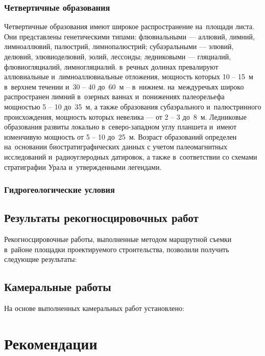 \subsubsection*{Четвертичные образования}
Четвертичные образования имеют широкое распространение на~площади листа. Они представлены генетическими типами: флювиальными --- аллювий, лимний, лимноаллювий, палюстрий, лимнопалюстрий; субаэральными --- элювий, делювий, элювиоделювий, эолий, лессоиды; ледниковыми --- гляциалий, флювиогляциалий, лимногляциалий. в~речных долинах превалируют аллювиальные и~лимноаллювиальные отложения, мощность которых 10 -- 15~м в~верхнем течении и~30 -- 40 до~60~м -- в~нижнем. на~междуречьях широко распространен лимний в~озерных ваннах и~понижениях палеорельефа мощностью 5 -- 10 до~35~м, а также образования субаэрального и~палюстринного происхождения, мощность которых невелика --- 
от 2 -- 3 до~8~м. Ледниковые образования развиты локально в~северо-западном углу планшета и~имеют изменчивую мощность от 5 -- 10 до~25~м.
Возраст образований определен на~основании биостратиграфических данных с учетом палеомагнитных исследований и~радиоуглеродных датировок, а также в~соответствии со схемами стратиграфии Урала и~утвержденными легендами.

\subsubsection{Гидрогеологические условия}
%
\hydrogeology


\subsection{Результаты рекогносцировочных работ}
Рекогносцировочные работы, выполненные методом маршрутной съемки в~районе площадки проектируемого строительства, позволили получить следующие результаты:

\txtRecog

\subsection{Камеральные работы}
На основе выполненных камеральных работ установлено:
\txtCamer

\section{Рекомендации}
\txtRecommend



